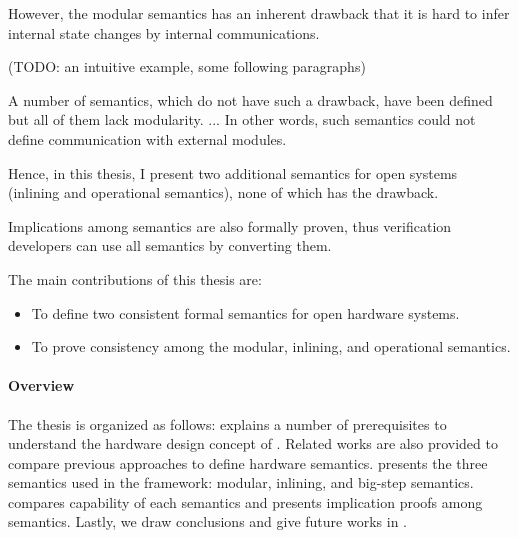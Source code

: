 However, the modular semantics has an inherent drawback that it is hard
to infer internal state changes by internal communications.

(TODO: an intuitive example, some following paragraphs)

A number of semantics, which do not have such a drawback, have been
defined but all of them lack modularity. ... In other words, such
semantics could not define communication with external modules.

Hence, in this thesis, I present two additional semantics for open
systems (inlining and operational semantics), none of which has the
drawback.

Implications among semantics are also formally proven, thus
verification developers can use all semantics by converting them.

The main contributions of this thesis are:
\begin{itemize}
\item To define two consistent formal semantics for open hardware
  systems.
\item To prove consistency among the modular, inlining, and
  operational semantics.
\end{itemize}

\paragraph{Overview}

The thesis is organized as follows: 
explains a number of prerequisites to understand the hardware design
concept of \Bluespec{}. Related works are also provided to compare
previous approaches to define hardware
semantics.  presents the three semantics used
in the \Kami{} framework: modular, inlining, and big-step
semantics.  compares capability of each
semantics and presents implication proofs among semantics. Lastly, we
draw conclusions and give future works in .






